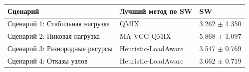 \begin{tabular}{lll}
\toprule
Сценарий & Лучший метод по SW & SW \\
\midrule
Сценарий 1: Стабильная нагрузка & QMIX & 3.262 $\pm$ 1.350 \\
Сценарий 2: Пиковая нагрузка & MA-VCG-QMIX & 5.868 $\pm$ 1.097 \\
Сценарий 3: Разнородные ресурсы & Heuristic-LoadAware & 3.547 $\pm$ 0.769 \\
Сценарий 4: Отказы узлов & Heuristic-LoadAware & 3.662 $\pm$ 0.719 \\
\bottomrule
\end{tabular}

